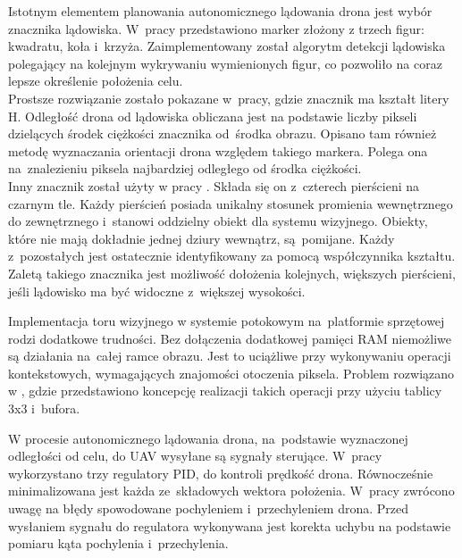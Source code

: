 Istotnym elementem planowania autonomicznego lądowania drona jest wybór znacznika lądowiska. 
W~pracy \cite{Falanga} przedstawiono marker złożony z trzech figur: kwadratu, koła i~krzyża. %
Zaimplementowany został algorytm detekcji lądowiska polegający na kolejnym wykrywaniu wymienionych figur, co pozwoliło na coraz lepsze określenie położenia celu.\\
Prostsze rozwiązanie zostało pokazane w~pracy\cite{H}, gdzie znacznik ma kształt litery H. 
Odległość drona od lądowiska obliczana jest na podstawie liczby pikseli dzielących środek ciężkości znacznika od~środka obrazu. 
Opisano tam również metodę wyznaczania orientacji drona względem takiego markera. 
Polega ona na~znalezieniu piksela najbardziej odległego od środka ciężkości.\\ %

Inny znacznik został użyty w pracy \cite{Rings}. 
Składa się on z~czterech pierścieni na czarnym tle. 
Każdy pierścień posiada unikalny stosunek promienia wewnętrznego do zewnętrznego i~stanowi oddzielny obiekt dla systemu wizyjnego. 
Obiekty, które nie mają dokładnie jednej dziury wewnątrz, są~pomijane. 
Każdy z~pozostałych jest ostatecznie identyfikowany za pomocą współczynnika kształtu. 
Zaletą takiego znacznika jest możliwość dołożenia kolejnych, większych pierścieni, jeśli lądowisko ma być widoczne z~większej wysokości.\par %
 
Implementacja toru wizyjnego w systemie potokowym na~platformie sprzętowej rodzi dodatkowe trudności. Bez dołączenia dodatkowej pamięci RAM niemożliwe są działania na~całej ramce obrazu. Jest to uciążliwe przy wykonywaniu operacji kontekstowych, wymagających znajomości otoczenia piksela. Problem rozwiązano w \cite{FPGA}, gdzie przedstawiono koncepcję realizacji takich operacji przy użyciu tablicy 3x3 i~bufora.\par %

W procesie autonomicznego lądowania drona, na~podstawie wyznaczonej odległości od celu, do UAV wysyłane są sygnały sterujące. 
W~pracy \cite{Sudevan} wykorzystano trzy regulatory PID, do kontroli prędkość drona. %
Równocześnie minimalizowana jest każda ze~składowych wektora położenia. 
W~pracy \cite{Rings} zwrócono uwagę na błędy spowodowane pochyleniem i~przechyleniem drona. 
Przed wysłaniem sygnału do regulatora wykonywana jest korekta uchybu na podstawie pomiaru kąta pochylenia i~przechylenia.\par %

